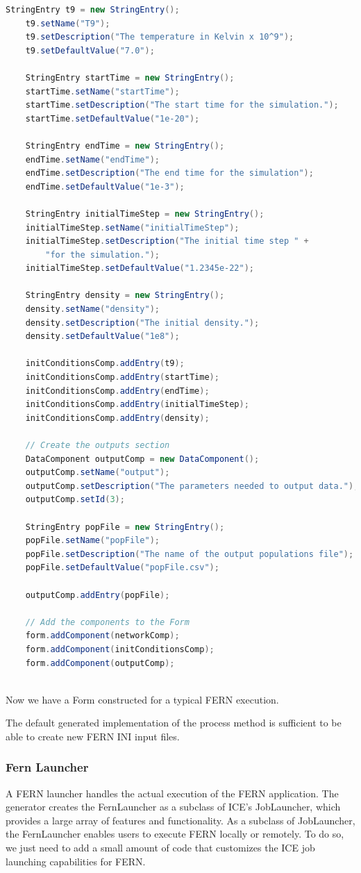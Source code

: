 \begin{lstlisting}[language=Java]
    StringEntry t9 = new StringEntry();
    t9.setName("T9");
    t9.setDescription("The temperature in Kelvin x 10^9");
    t9.setDefaultValue("7.0");

    StringEntry startTime = new StringEntry();
    startTime.setName("startTime");
    startTime.setDescription("The start time for the simulation.");
    startTime.setDefaultValue("1e-20");

    StringEntry endTime = new StringEntry();
    endTime.setName("endTime");
    endTime.setDescription("The end time for the simulation");
    endTime.setDefaultValue("1e-3");

    StringEntry initialTimeStep = new StringEntry();
    initialTimeStep.setName("initialTimeStep");
    initialTimeStep.setDescription("The initial time step " + 
    	"for the simulation."); 
    initialTimeStep.setDefaultValue("1.2345e-22");

    StringEntry density = new StringEntry();
    density.setName("density");
    density.setDescription("The initial density.");
    density.setDefaultValue("1e8");
    
    initConditionsComp.addEntry(t9);
    initConditionsComp.addEntry(startTime);
    initConditionsComp.addEntry(endTime);
    initConditionsComp.addEntry(initialTimeStep);
    initConditionsComp.addEntry(density);
    
    // Create the outputs section
    DataComponent outputComp = new DataComponent();
    outputComp.setName("output");
    outputComp.setDescription("The parameters needed to output data.");
    outputComp.setId(3);
    
    StringEntry popFile = new StringEntry();
    popFile.setName("popFile");
    popFile.setDescription("The name of the output populations file");
    popFile.setDefaultValue("popFile.csv");
    
    outputComp.addEntry(popFile);
    
    // Add the components to the Form
    form.addComponent(networkComp);    
    form.addComponent(initConditionsComp);
    form.addComponent(outputComp);
    
\end{lstlisting}

Now we have a Form constructed for a typical FERN execution. 

The default generated implementation of the process method is sufficient to be
able to create new FERN INI input files. 

\subsubsection{Fern Launcher}
A FERN launcher handles the actual execution of the FERN application. The
generator creates the FernLauncher as a subclass of ICE's JobLauncher, which
provides a large array of features and functionality. As a subclass of
JobLauncher, the FernLauncher enables users to execute FERN locally or remotely.
To do so, we just need to add a small amount of
code that customizes the ICE job launching capabilities for FERN. 

